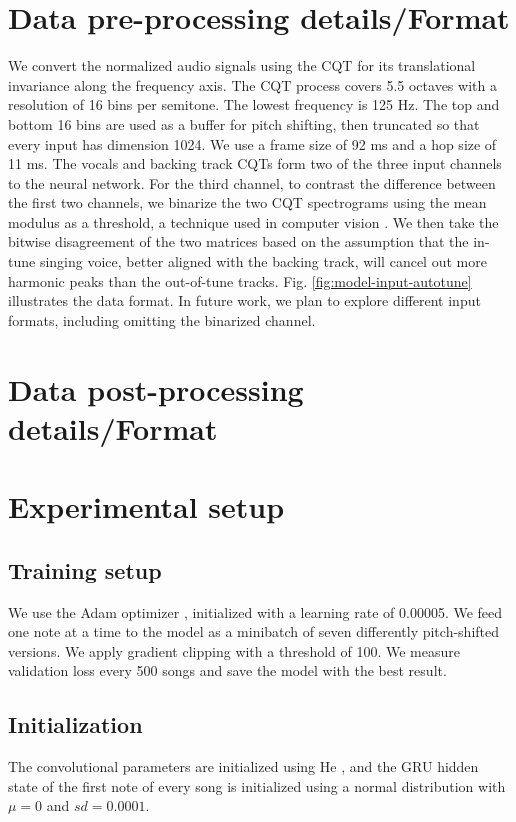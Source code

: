 \section{Data pre-processing details/Format}
\label{sec:data-format-autotune}
We convert the normalized audio signals using the CQT for its translational invariance along the frequency axis. The CQT process covers 5.5 octaves with a resolution of 16 bins per semitone. The lowest frequency is 125 Hz. The top and bottom 16 bins are used as a buffer for pitch shifting, then truncated so that every input has dimension 1024. We use a frame size of 92 ms and a hop size of 11 ms. The vocals and backing track CQTs form two of the three input channels to the neural network. For the third channel, to contrast the difference between the first two channels, we binarize the two CQT spectrograms using the mean modulus as a threshold, a technique used in computer vision \cite{sezgin2004survey}. We then take the bitwise disagreement of the two matrices based on the assumption that the in-tune singing voice, better aligned with the backing track, will cancel out more harmonic peaks than the out-of-tune tracks. Fig. \ref{fig:model-input-autotune} illustrates the data format. In future work, we plan to explore different input formats, including omitting the binarized channel.

\section{Data post-processing details/Format}
\cite{charpentier1986diphone}


\section{Experimental setup}
\label{sec:experiments-autotune}
\subsection{Training setup}
We use the Adam optimizer \cite{kingma2014adam}, initialized with a learning rate of 0.00005. We feed one note at a time to the model as a minibatch of seven differently pitch-shifted versions. We apply gradient clipping \cite{pascanu2013difficulty} with a threshold of 100. We measure validation loss every 500 songs and save the model with the best result. 
\subsection{Initialization}
The convolutional parameters are initialized using He \cite{he2015delving}, and the GRU hidden state of the first note of every song is initialized using a normal distribution with $\mu=0$ and $sd=0.0001$.

